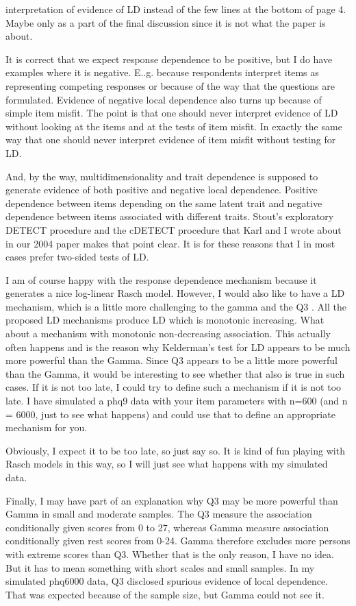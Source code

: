 \documentclass{article}
\begin{document}
interpretation of evidence of LD instead of the few lines at the bottom of page 4. Maybe only as a part of the final discussion since it is not what the paper is about.

It is correct that we expect response dependence to be positive, but I do have examples where it is negative. E..g. because respondents interpret items as representing competing responses or because of the way that the questions are formulated. Evidence of negative local dependence also turns up because of simple item misfit. The point is that one should never interpret evidence of LD without looking at the items and at the tests of item misfit. In exactly the same way that one should never interpret evidence of item misfit without testing for LD. 

And, by the way, multidimensionality and trait dependence is supposed to generate evidence of both positive and negative local dependence. Positive dependence between items depending on the same latent trait and negative dependence between items associated with different traits. Stout’s exploratory DETECT procedure \citep{stout1996} and the cDETECT procedure that Karl and I wrote about in our 2004 paper \citep{kreinerchristensen2004} makes that point clear. It is for these reasons that I in most cases prefer two-sided tests of LD.

I am of course happy with the response dependence mechanism because it generates a nice log-linear Rasch model. However, I would also like to have a LD mechanism, which is a little more challenging to the gamma \citep{davis1967} and the Q3 \citep{yen1984}. All the proposed LD mechanisms produce LD which is monotonic increasing. What about a mechanism with monotonic non-decreasing association. This actually often happens and is the reason why Kelderman’s test for LD \citep{kelderman1984} appears to be much more powerful than the Gamma. Since Q3 appears to be a little more powerful than the Gamma, it would be interesting to see whether that also is true in such cases.  If it is not too late, I could try to define such a mechanism if it is not too late. I have simulated a phq9 data with your item parameters with n=600 (and n = 6000, just to see what happens) and could use that to define an appropriate mechanism for you.

Obviously, I expect it to be too late, so just say so. It is kind of fun playing with Rasch models in this way, so I will just see what happens with my simulated data.

Finally, I may have part of an explanation why Q3 may be more powerful than Gamma in small and moderate samples. The Q3 measure the association conditionally given scores from 0 to 27, whereas Gamma measure association conditionally given rest scores from 0-24. Gamma therefore excludes more persons with extreme scores than Q3. Whether that is the only reason, I have no idea. But it has to mean something with short scales and small samples.  In my simulated phq6000  data, Q3 disclosed spurious evidence of local dependence. That was expected because of the sample size, but Gamma could not see it.
\end{document}
